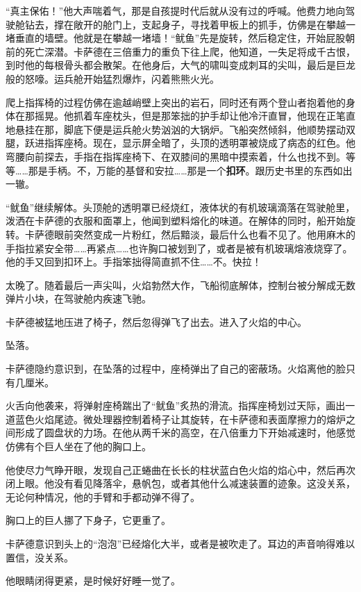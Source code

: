 \documentclass[AutoFakeBold=true]{book}
\begin{document}
``真主保佑！''他大声喘着气，那是自孩提时代后就从没有过的呼喊。他费力地向驾驶舱钻去，撑在敞开的舱门上，支起身子，寻找着甲板上的抓手，仿佛是在攀越一堵垂直的墙壁。他就是在攀越一堵墙！``鱿鱼''先是旋转，然后稳定住，开始屁股朝前的死亡深潜。卡萨德在三倍重力的重负下往上爬，他知道，一失足将成千古恨，到时他的每根骨头都会散架。在他身后，大气的啸叫变成刺耳的尖叫，最后是巨龙般的怒嚎。运兵舱开始猛烈爆炸，闪着熊熊火光。

爬上指挥椅的过程仿佛在逾越峭壁上突出的岩石，同时还有两个登山者抱着他的身体在那摇晃。他抓着车座枕头，但是那笨拙的护手却让他冷汗直冒，他现在正笔直地悬挂在那，脚底下便是运兵舱火势汹汹的大锅炉。飞船突然倾斜，他顺势摆动双腿，跃进指挥座椅。现在，显示屏全暗了，头顶的透明罩被烧成了病态的红色。他弯腰向前探去，手指在指挥座椅下、在双膝间的黑暗中摸索着，什么也找不到。等等……那是手柄。不，万能的基督和安拉……那是一个{\bf \kaishu 扣环}。跟历史书里的东西如出一辙。

``鱿鱼''继续解体。头顶舱的透明罩已经烧红，液体状的有机玻璃滴落在驾驶舱里，泼洒在卡萨德的衣服和面罩上，他闻到塑料熔化的味道。在解体的同时，船开始旋转。卡萨德眼前突然变成一片粉红，然后黯淡，最后什么也看不见了。他用麻木的手指拉紧安全带……再紧点……也许胸口被划到了，或者是被有机玻璃熔液烧穿了。他的手又回到扣环上。手指笨拙得简直抓不住……不。快拉！

太晚了。随着最后一声尖叫，火焰勃然大作，飞船彻底解体，控制台被分解成无数弹片小块，在驾驶舱内疾速飞驰。

卡萨德被猛地压进了椅子，然后忽得弹飞了出去。进入了火焰的中心。

坠落。

卡萨德隐约意识到，在坠落的过程中，座椅弹出了自己的密蔽场。火焰离他的脸只有几厘米。

火舌向他袭来，将弹射座椅踹出了``鱿鱼''炙热的滑流。指挥座椅划过天际，画出一道蓝色火焰尾迹。微处理器控制着椅子让其旋转，在卡萨德和表面摩擦力的熔炉之间形成了圆盘状的力场。在他从两千米的高空，在八倍重力下开始减速时，他感觉仿佛有个巨人坐在了他的胸口上。

他使尽力气睁开眼，发现自己正蜷曲在长长的柱状蓝白色火焰的焰心中，然后再次闭上眼。他没有看见降落伞，悬帆包，或者其他什么减速装置的迹象。这没关系，无论何种情况，他的手臂和手都动弹不得了。

胸口上的巨人挪了下身子，它更重了。

卡萨德意识到头上的``泡泡''已经熔化大半，或者是被吹走了。耳边的声音响得难以置信，没关系。

他眼睛闭得更紧，是时候好好睡一觉了。

\vspace*{1em}
\end{document}
